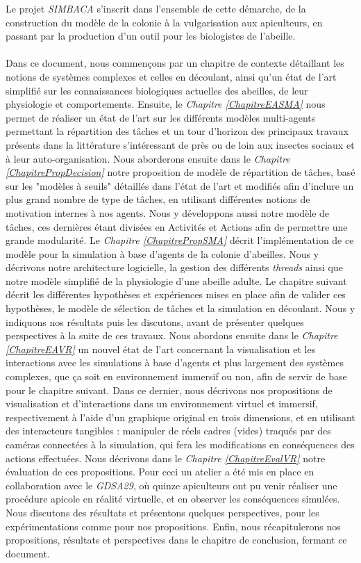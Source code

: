 	Le projet \textit{SIMBACA} s'inscrit dans l'ensemble de cette démarche, de la construction du modèle de la colonie à la vulgarisation aux apiculteurs, en passant par la production d'un outil pour les biologistes de l'abeille.
	
	\paragraph{}
	Dans ce document, nous commençons par un chapitre de contexte détaillant les notions de systèmes complexes et celles en découlant, ainsi qu'un état de l'art simplifié sur les connaissances biologiques actuelles des abeilles, de leur physiologie et comportements.
	 Ensuite, le \textit{Chapitre \ref{ChapitreEASMA}} nous permet de réaliser un état de l'art sur les différents modèles multi-agents permettant la répartition des tâches et un tour d'horizon des principaux travaux présents dans la littérature s'intéressant de près ou de loin aux insectes sociaux et à leur auto-organisation. 
	 Nous aborderons ensuite dans le \textit{Chapitre \ref{ChapitrePropDecision}} notre proposition de modèle de répartition de tâches, basé sur les "modèles à seuils" détaillés dans l'état de l'art et modifiés afin d'inclure un plus grand nombre de type de tâches, en utilisant différentes notions de motivation internes à nos agents. Nous y développons aussi notre modèle de tâches, ces dernières étant divisées en Activités et Actions afin de permettre une grande modularité. 
	 Le \textit{Chapitre \ref{ChapitrePropSMA}} décrit l'implémentation de ce modèle pour la simulation à base d'agents de la colonie d'abeilles. Nous y décrivons notre architecture logicielle, la gestion des différents \textit{threads} ainsi que notre modèle simplifié de la physiologie d'une abeille adulte. 
	 Le chapitre suivant décrit les différentes hypothèses et expériences mises en place afin de valider ces hypothèses, le modèle de sélection de tâches et la simulation en découlant. Nous y indiquons nos résultats puis les discutons, avant de présenter quelques perspectives à la suite de ces travaux. 
	 Nous abordons ensuite dans le \textit{Chapitre \ref{ChapitreEAVR}} un nouvel état de l'art concernant la visualisation et les interactions avec les simulations à base d'agents et plus largement des systèmes complexes, que ça soit en environnement immersif ou non, afin de servir de base pour le chapitre suivant. 
	 Dans ce dernier, nous décrivons nos propositions de visualisation et d'interactions dans un environnement virtuel et immersif, respectivement à l'aide d'un graphique original en trois dimensions, et en utilisant des interacteurs tangibles : manipuler de réels cadres (vides) traqués par des caméras connectées à la simulation, qui fera les modifications en conséquences des actions effectuées. 
	 Nous décrivons dans le \textit{Chapitre \ref{ChapitreEvalVR}} notre évaluation de ces propositions. Pour ceci un atelier a été mis en place en collaboration avec le \textit{GDSA29}, où quinze apiculteurs ont pu venir réaliser une procédure apicole en réalité virtuelle, et en observer les conséquences simulées. Nous discutons des résultats et présentons quelques perspectives, pour les expérimentations comme pour nos propositions. 
	 Enfin, nous récapitulerons nos propositions, résultats et perspectives dans le chapitre de conclusion, fermant ce document.